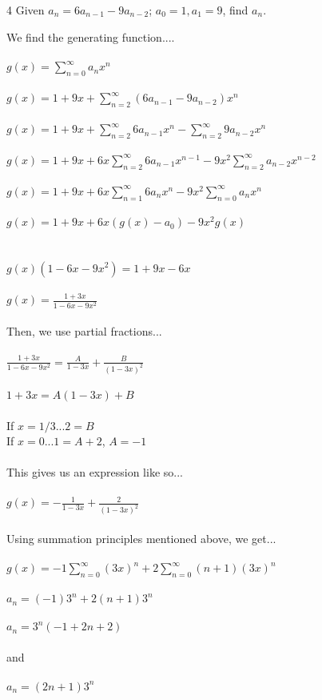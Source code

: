 \begin{problem} 4
Given $a_n = 6a_{n-1} - 9a_{n-2}$; $a_0 = 1, a_1 = 9$, find $a_n$.
\end{problem}
\begin{solution}
We find the generating function....\\\\
$g(x) = \sum_{n = 0}^\infty a_nx^n$\\\\
$g(x) = 1 + 9x + \sum_{n = 2}^\infty (6a_{n-1} - 9a_{n-2})x^n$\\\\
$g(x) = 1 + 9x + \sum_{n = 2}^\infty 6a_{n-1}x^n - \sum_{n = 2}^\infty 9a_{n-2}x^n$\\\\
$g(x) = 1 + 9x + 6x\sum_{n = 2}^\infty 6a_{n-1}x^{n-1} - 9x^2\sum_{n = 2}^\infty a_{n-2}x^{n-2}$\\\\
$g(x) = 1 + 9x + 6x\sum_{n = 1}^\infty 6a_{n}x^{n} - 9x^2\sum_{n = 0}^\infty a_{n}x^{n}$\\\\
$g(x) = 1 + 9x + 6x(g(x) - a_0) - 9x^2g(x)$\\\\\\
$g(x)(1 - 6x - 9x^2) = 1 + 9x - 6x$\\\\
$g(x) = \frac{1 + 3x}{1 - 6x - 9x^2}$\\\\
Then, we use partial fractions...\\\\
$\frac{1 + 3x}{1 - 6x - 9x^2} = \frac{A}{1 - 3x} + \frac{B}{(1 - 3x)^2}$\\\\
$1 + 3x = A(1 - 3x) + B$\\\\
If $x = 1/3$...$2 = B$\\
If $x = 0$...$1 = A + 2$, $A = -1$\\\\
This gives us an expression like so...\\\\
$g(x) = -\frac{1}{1 - 3x} + \frac{2}{(1 - 3x)^2}$\\\\
Using summation principles mentioned above, we get...\\\\
$g(x) = -1\sum_{n = 0}^\infty (3x)^n + 2\sum_{n = 0}^\infty (n + 1)(3x)^n$\\\\
$a_n = (-1)3^n + 2(n + 1)3^n$\\\\
$a_n = 3^n(-1 + 2n + 2)$\\\\
and\\\\
$a_n = (2n + 1)3^n$

\end{solution} \\



